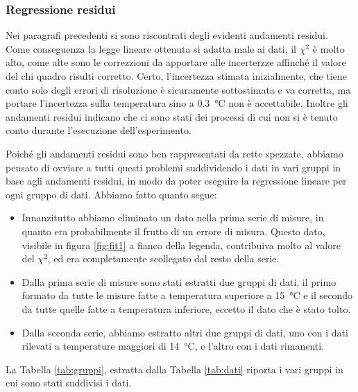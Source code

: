 \subsubsection{Regressione residui}

Nei paragrafi precedenti si sono riscontrati degli evidenti andamenti residui. Come conseguenza la legge lineare ottenuta
si adatta male ai dati, il $\chi^2$ è molto alto, come alte sono le correzzioni da apportare alle incerterzze affinché 
il valore del chi quadro risulti corretto. Certo, l'incertezza stimata inizialmente, che tiene conto solo degli errori di risoluzione
è sicuramente sottostimata e va corretta, ma portare l'incertezza sulla temperatura sino a \SI{0.3}{\celsius} non è accettabile.
Inoltre gli andamenti residui indicano che ci sono stati dei processi di cui non si è tenuto conto durante l'esecuzione dell'esperimento.

Poiché gli andamenti residui sono ben rappresentati da rette spezzate, abbiamo pensato di ovviare a tutti questi problemi suddividendo i
dati in vari gruppi in base agli andamenti residui, in modo da poter eseguire la regressione lineare per ogni gruppo di dati.
Abbiamo fatto quanto segue:

\begin{itemize}
    \item{Innanzitutto abbiamo eliminato un dato nella prima serie di misure, in quanto era probabilmente il frutto di un
        errore di misura. Questo dato, visibile in figura \ref{fig:fit1} a fianco della legenda,
        contribuiva molto al valore del $\chi^2$, ed era completamente scollegato dal resto della serie.}
    \item{Dalla prima serie di misure sono stati estratti due gruppi di dati, il primo formato da tutte le misure fatte
        a temperatura superiore a \SI{15}{\celsius} e il secondo da tutte quelle fatte a temperatura inferiore, eccetto
        il dato che è stato tolto.}
    \item{Dalla seconda serie, abbiamo estratto altri due gruppi di dati, uno con i dati rilevati a temperature maggiori di
        \SI{14}{\celsius}, e l'altro con i dati rimanenti.}
\end{itemize}

La Tabella \ref{tab:gruppi}, estratta dalla Tabella \ref{tab:dati} riporta i vari gruppi in cui sono stati suddivisi i dati.

